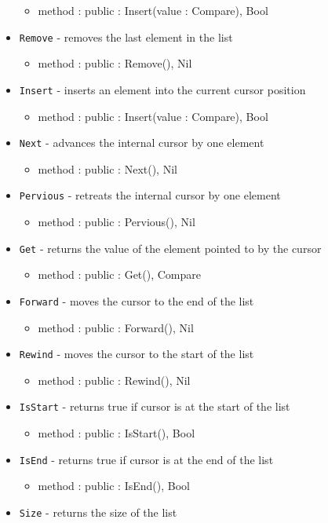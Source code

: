 \documentclass[12pt]{article}
\begin{document}
\begin{itemize}
    	\begin{itemize}
	\item method : public : Insert(value : Compare), Bool
	\end{itemize}
    \item \texttt{Remove} - removes the last element in the list
    	\begin{itemize}
	\item method : public : Remove(), Nil
	\end{itemize}
    \item \texttt{Insert} - inserts an element into the current cursor position
    	\begin{itemize}
	\item method : public : Insert(value : Compare), Bool
	\end{itemize}	
    \item \texttt{Next} - advances the internal cursor by one element
    	\begin{itemize}
	\item method : public : Next(), Nil
	\end{itemize}
    \item \texttt{Pervious} - retreats the internal cursor by one element
    	\begin{itemize}
	\item method : public : Pervious(), Nil
	\end{itemize}
    \item \texttt{Get} - returns the value of the element  pointed to by the cursor
    	\begin{itemize}
	\item method : public : Get(), Compare
	\end{itemize}
    \item \texttt{Forward} - moves the cursor to the end of the list
    	\begin{itemize}
	\item method : public : Forward(), Nil
	\end{itemize}
    \item \texttt{Rewind} - moves the cursor to the start of the list
    	\begin{itemize}
	\item method : public : Rewind(), Nil
	\end{itemize}
    \item \texttt{IsStart} - returns true if cursor is at the start of the list
    	\begin{itemize}
	\item method : public : IsStart(), Bool
	\end{itemize}
    \item \texttt{IsEnd} - returns true if cursor is at the end of the list
    	\begin{itemize}
	\item method : public : IsEnd(), Bool
	\end{itemize}		
    \item \texttt{Size} - returns the size of the list
\end{itemize}
\end{document}
